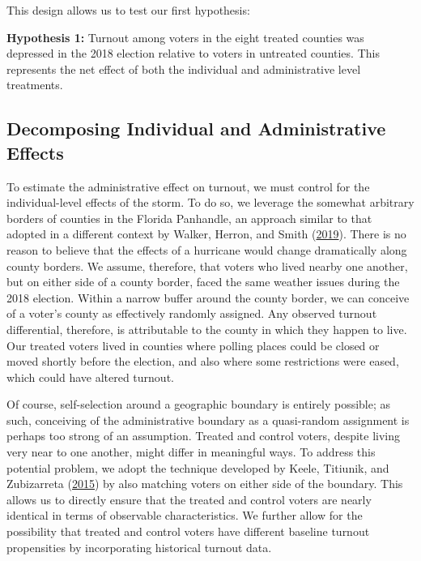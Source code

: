 \documentclass[
  12pt,
]{article}
\begin{document}
This design allows us to test our first hypothesis:

\textbf{Hypothesis 1:} Turnout among voters in the eight treated counties was depressed in the 2018 election relative to voters in untreated counties. This represents the net effect of both the individual and administrative level treatments.

\hypertarget{decomposing-individual-and-administrative-effects}{%
\subsection*{Decomposing Individual and Administrative Effects}\label{decomposing-individual-and-administrative-effects}}

To estimate the administrative effect on turnout, we must control for the individual-level effects of the storm. To do so, we leverage the somewhat arbitrary borders of counties in the Florida Panhandle, an approach similar to that adopted in a different context by Walker, Herron, and Smith (\protect\hyperlink{ref-Walker2019}{2019}). There is no reason to believe that the effects of a hurricane would change dramatically along county borders. We assume, therefore, that voters who lived nearby one another, but on either side of a county border, faced the same weather issues during the 2018 election. Within a narrow buffer around the county border, we can conceive of a voter's county as effectively randomly assigned. Any observed turnout differential, therefore, is attributable to the county in which they happen to live. Our treated voters lived in counties where polling places could be closed or moved shortly before the election, and also where some restrictions were eased, which could have altered turnout.

Of course, self-selection around a geographic boundary is entirely possible; as such, conceiving of the administrative boundary as a quasi-random assignment is perhaps too strong of an assumption. Treated and control voters, despite living very near to one another, might differ in meaningful ways. To address this potential problem, we adopt the technique developed by Keele, Titiunik, and Zubizarreta (\protect\hyperlink{ref-Keele2015a}{2015}) by also matching voters on either side of the boundary. This allows us to directly ensure that the treated and control voters are nearly identical in terms of observable characteristics. We further allow for the possibility that treated and control voters have different baseline turnout propensities by incorporating historical turnout data.
\end{document}
